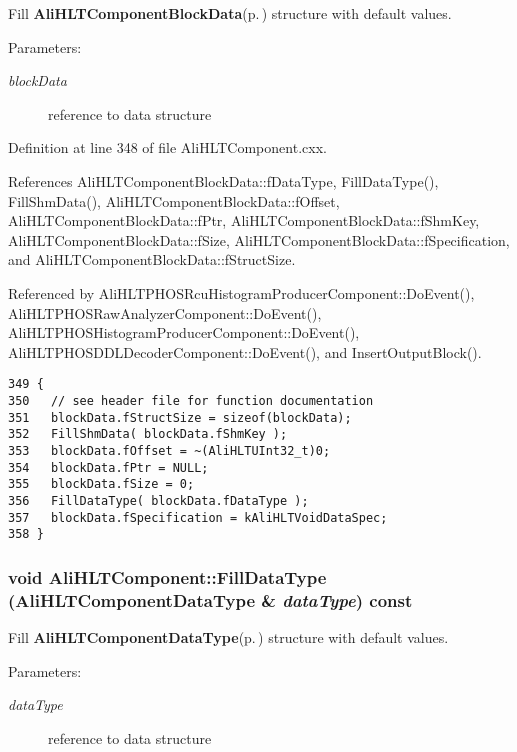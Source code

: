 Fill {\bf Ali\-HLTComponent\-Block\-Data}{\rm (p.\,\pageref{structAliHLTComponentBlockData})} structure with default values. \begin{Desc}
\item[Parameters:]
\begin{description}
\item[{\em block\-Data}]reference to data structure \end{description}
\end{Desc}


Definition at line 348 of file Ali\-HLTComponent.cxx.

References Ali\-HLTComponent\-Block\-Data::f\-Data\-Type, Fill\-Data\-Type(), Fill\-Shm\-Data(), Ali\-HLTComponent\-Block\-Data::f\-Offset, Ali\-HLTComponent\-Block\-Data::f\-Ptr, Ali\-HLTComponent\-Block\-Data::f\-Shm\-Key, Ali\-HLTComponent\-Block\-Data::f\-Size, Ali\-HLTComponent\-Block\-Data::f\-Specification, and Ali\-HLTComponent\-Block\-Data::f\-Struct\-Size.

Referenced by Ali\-HLTPHOSRcu\-Histogram\-Producer\-Component::Do\-Event(), Ali\-HLTPHOSRaw\-Analyzer\-Component::Do\-Event(), Ali\-HLTPHOSHistogram\-Producer\-Component::Do\-Event(), Ali\-HLTPHOSDDLDecoder\-Component::Do\-Event(), and Insert\-Output\-Block().

\footnotesize\begin{verbatim}349 {
350   // see header file for function documentation
351   blockData.fStructSize = sizeof(blockData);
352   FillShmData( blockData.fShmKey );
353   blockData.fOffset = ~(AliHLTUInt32_t)0;
354   blockData.fPtr = NULL;
355   blockData.fSize = 0;
356   FillDataType( blockData.fDataType );
357   blockData.fSpecification = kAliHLTVoidDataSpec;
358 }
\end{verbatim}\normalsize 


\subsubsection{\setlength{\rightskip}{0pt plus 5cm}void Ali\-HLTComponent::Fill\-Data\-Type ({\bf Ali\-HLTComponent\-Data\-Type} \& {\em data\-Type}) const\hspace{0.3cm}{\tt  [protected]}}\label{classAliHLTComponent_b2}


Fill {\bf Ali\-HLTComponent\-Data\-Type}{\rm (p.\,\pageref{structAliHLTComponentDataType})} structure with default values. \begin{Desc}
\item[Parameters:]
\begin{description}
\item[{\em data\-Type}]reference to data structure \end{description}
\end{Desc}


